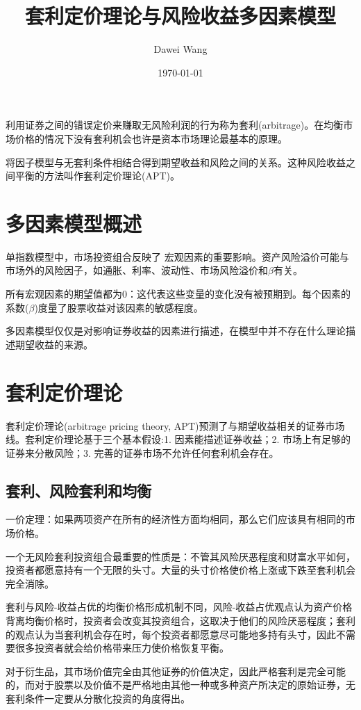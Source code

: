 \documentclass{article}
\title{套利定价理论与风险收益多因素模型}
\author{Dawei Wang}
\date{\today}
\begin{document}
	\maketitle
利用证券之间的错误定价来赚取无风险利润的行为称为套利(arbitrage)。在均衡市场价格的情况下没有套利机会也许是资本市场理论最基本的原理。

将因子模型与无套利条件相结合得到期望收益和风险之间的关系。这种风险收益之间平衡的方法叫作套利定价理论(APT)。

\section{多因素模型概述}
单指数模型中，市场投资组合反映了 宏观因素的重要影响。资产风险溢价可能与市场外的风险因子，如通胀、利率、波动性、市场风险溢价和$ \beta $有关。

所有宏观因素的期望值都为0：这代表这些变量的变化没有被预期到。每个因素的系数($\beta$)度量了股票收益对该因素的敏感程度。

多因素模型仅仅是对影响证券收益的因素进行描述，在模型中并不存在什么理论描述期望收益的来源。

\section{套利定价理论}
套利定价理论(arbitrage pricing theory, APT)预测了与期望收益相关的证券市场线。套利定价理论基于三个基本假设:1. 因素能描述证券收益；2. 市场上有足够的证券来分散风险；3. 完善的证券市场不允许任何套利机会存在。

\subsection{套利、风险套利和均衡}
一价定理：如果两项资产在所有的经济性方面均相同，那么它们应该具有相同的市场价格。

一个无风险套利投资组合最重要的性质是：不管其风险厌恶程度和财富水平如何，投资者都愿意持有一个无限的头寸。大量的头寸价格使价格上涨或下跌至套利机会完全消除。

套利与风险-收益占优的均衡价格形成机制不同，风险-收益占优观点认为资产价格背离均衡价格时，投资者会改变其投资组合，这取决于他们的风险厌恶程度；套利的观点认为当套利机会存在时，每个投资者都愿意尽可能地多持有头寸，因此不需要很多投资者就会给价格带来压力使价格恢复平衡。

对于衍生品，其市场价值完全由其他证券的价值决定，因此严格套利是完全可能的，而对于股票以及价值不是严格地由其他一种或多种资产所决定的原始证券，无套利条件一定要从分散化投资的角度得出。
\end{document}
